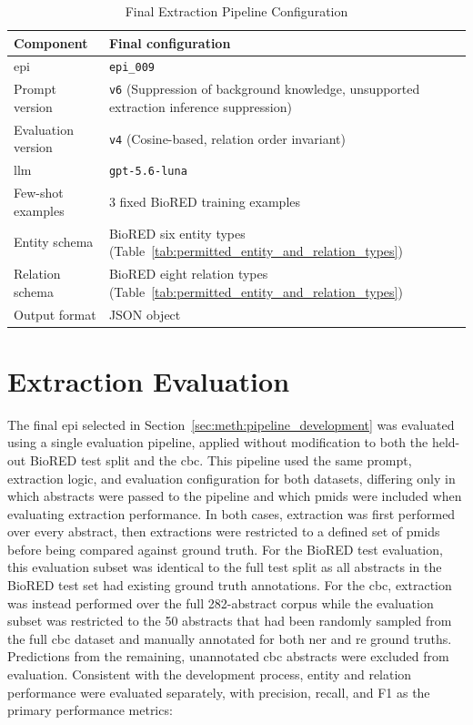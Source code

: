 \begin{table}[H]
    \centering
    \caption{Final Extraction Pipeline Configuration}
    \label{tab:final_epi_config}
    \begin{tabularx}{\textwidth}{l X}
        \toprule
        Component & Final configuration \\
        \midrule
        \gls{epi} & \texttt{epi\_009} \\
        Prompt version & \texttt{v6} (Suppression of background knowledge, unsupported extraction inference suppression) \\
        Evaluation version & \texttt{v4} (Cosine-based, relation order invariant) \\
        \gls{llm} & \texttt{gpt-5.6-luna} \\
        Few-shot examples & 3 fixed BioRED training examples \\
        Entity schema & BioRED six entity types (Table~\ref{tab:permitted_entity_and_relation_types}) \\
        Relation schema & BioRED eight relation types (Table~\ref{tab:permitted_entity_and_relation_types}) \\
        Output format & JSON object \\
        \bottomrule
    \end{tabularx}
\end{table}

\section{Extraction Evaluation}
\label{sec:meth:extraction_evaluation}
The final \gls{epi} selected in Section~\ref{sec:meth:pipeline_development} was evaluated using a single evaluation pipeline, applied without modification to both the held-out BioRED test split and the \gls{cbc}. This pipeline used the same prompt, extraction logic, and evaluation configuration for both datasets, differing only in which abstracts were passed to the pipeline and which \glspl{pmid} were included when evaluating extraction performance. In both cases, extraction was first performed over every abstract, then extractions were restricted to a defined set of \glspl{pmid} before being compared against ground truth. For the BioRED test evaluation, this evaluation subset was identical to the full test split as all abstracts in the BioRED test set had existing ground truth annotations. For the \gls{cbc}, extraction was instead performed over the full 282-abstract corpus while the evaluation subset was restricted to the 50 abstracts that had been randomly sampled from the full \gls{cbc} dataset and manually annotated for both \gls{ner} and \gls{re} ground truths. Predictions from the remaining, unannotated \gls{cbc} abstracts were excluded from evaluation. Consistent with the development process, entity and relation performance were evaluated separately, with precision, recall, and F1 as the primary performance metrics:

